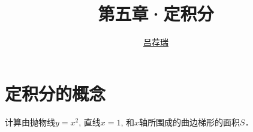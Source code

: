\documentclass[14pt,notheorems,leqno,xcolor={rgb}]{beamer} %
\begin{document}
\title{第五章·定积分}
\author{\href{https://lvjr.bitbucket.io}{吕荐瑞}}

\begin{frame}[plain]
\titlepage
\end{frame}

\section{定积分的概念}

\begin{frame}
\begin{example}
计算由抛物线$y=x^2$, 直线$x=1$, 和$x$轴所围成的曲边梯形的面积$S$．
\end{example}
\end{frame}
\end{document}
